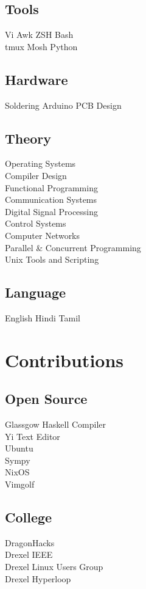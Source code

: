 \documentclass[]{deedy}
\begin{document}
\begin{minipage}[t]{0.33\textwidth}
\sectionsep
\subsection{Tools}
Vi \textbullet{} Awk \textbullet{} ZSH \textbullet{} Bash \\
tmux \textbullet{} Mosh \textbullet{} Python
\sectionsep

\subsection{Hardware}
Soldering \textbullet{} Arduino \textbullet{} PCB Design
\sectionsep

\subsection{Theory}
Operating Systems \\
Compiler Design \\
Functional Programming \\
Communication Systems \\
Digital Signal Processing \\
Control Systems \\
Computer Networks \\
Parallel \& Concurrent Programming \\
Unix Tools and Scripting
\sectionsep

\subsection{Language}
English \textbullet{} Hindi \textbullet{} Tamil


\section{Contributions}
\subsection{Open Source}
Glassgow Haskell Compiler \\
Yi Text Editor \\
Ubuntu \\
Sympy \\
NixOS \\
Vimgolf
\sectionsep

\subsection{College}
DragonHacks \\
Drexel IEEE \\
Drexel Linux Users Group \\
Drexel Hyperloop
\sectionsep

%
%

\end{minipage} 
\end{document}
